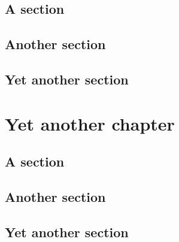 \documentclass{abe}
\begin{document}
\section{A section}
\section{Another section}
\section{Yet another section}

\chapter{Yet another chapter}
\section{A section}
\section{Another section}
\section{Yet another section}

\backmatter%
 
\end{document}
